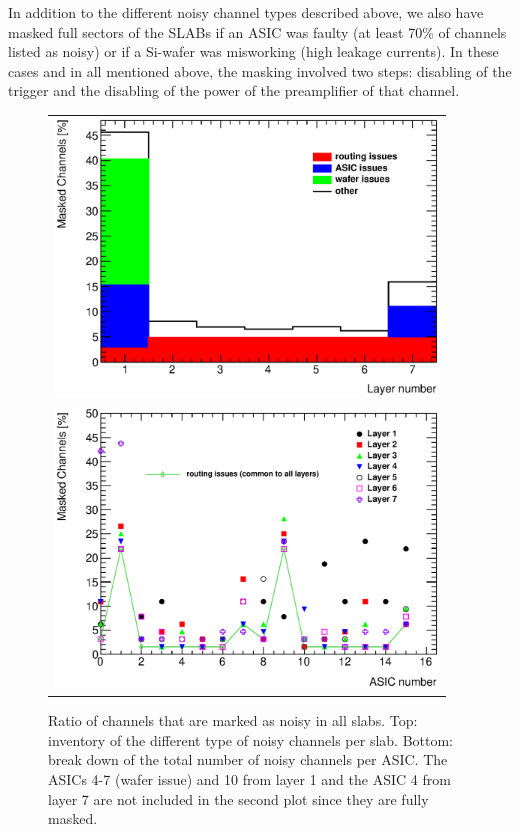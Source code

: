 \documentclass[a4paper,11pt]{article}
\begin{document}
In addition to the different noisy channel types described above, we also have
masked full sectors of the SLABs if an ASIC was faulty (at least 70\% of channels 
listed as noisy) or if a Si-wafer was misworking (high leakage currents). In these cases 
and in all mentioned above, the masking involved two steps: disabling of the trigger and 
the disabling of the power of the preamplifier of that channel.

\begin{figure}[!t]
  \centering
  \begin{tabular}{l}
  \includegraphics[width=4in]{../figs/commissioning/masked_layer.eps} \\
  \includegraphics[width=4in]{../figs/commissioning/masked_chip.eps}
  \end{tabular}
\caption{Ratio of channels that are marked as noisy in all slabs. 
Top: inventory of the different type of noisy channels per slab. 
Bottom: break down of the total number of noisy channels per ASIC. 
The ASICs 4-7 (wafer issue) and 10 from layer 1 and the ASIC 4 from layer 7 are not included
in the second plot since they are fully masked.}
\label{noisycells}
\end{figure}
\end{document}
